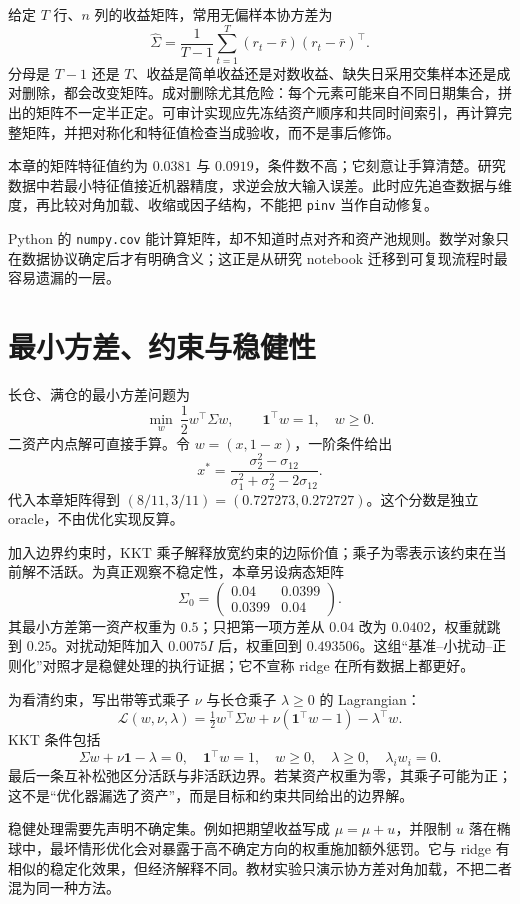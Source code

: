 给定 $T$ 行、$n$ 列的收益矩阵，常用无偏样本协方差为
\[
 \widehat\Sigma=\frac{1}{T-1}
 \sum_{t=1}^{T}(r_t-\bar r)(r_t-\bar r)^\top.
\]
分母是 $T-1$ 还是 $T$、收益是简单收益还是对数收益、缺失日采用交集样本还是成对删除，都会改变矩阵。成对删除尤其危险：每个元素可能来自不同日期集合，拼出的矩阵不一定半正定。可审计实现应先冻结资产顺序和共同时间索引，再计算完整矩阵，并把对称化和特征值检查当成验收，而不是事后修饰。

本章的矩阵特征值约为 $0.0381$ 与 $0.0919$，条件数不高；它刻意让手算清楚。研究数据中若最小特征值接近机器精度，求逆会放大输入误差。此时应先追查数据与维度，再比较对角加载、收缩或因子结构，不能把 \verb|pinv| 当作自动修复。

Python 的 \verb|numpy.cov| 能计算矩阵，却不知道时点对齐和资产池规则。数学对象只在数据协议确定后才有明确含义；这正是从研究 notebook 迁移到可复现流程时最容易遗漏的一层。

\section{最小方差、约束与稳健性}

长仓、满仓的最小方差问题为
\[
 \min_w\ \frac12 w^\top\Sigma w,
 \qquad \mathbf1^\top w=1,\quad w\ge0.
\]
二资产内点解可直接手算。令 $w=(x,1-x)$，一阶条件给出
\[
 x^*=\frac{\sigma_2^2-\sigma_{12}}
 {\sigma_1^2+\sigma_2^2-2\sigma_{12}}.
\]
代入本章矩阵得到 $(8/11,3/11)=(0.727273,0.272727)$。这个分数是独立 oracle，不由优化实现反算。

加入边界约束时，KKT 乘子解释放宽约束的边际价值；乘子为零表示该约束在当前解不活跃。为真正观察不稳定性，本章另设病态矩阵
\[
 \Sigma_0=\begin{pmatrix}0.04&0.0399\\0.0399&0.04\end{pmatrix}.
\]
其最小方差第一资产权重为 $0.5$；只把第一项方差从 $0.04$ 改为 $0.0402$，权重就跳到 $0.25$。对扰动矩阵加入 $0.0075I$ 后，权重回到 $0.493506$。这组“基准--小扰动--正则化”对照才是稳健处理的执行证据；它不宣称 ridge 在所有数据上都更好。

为看清约束，写出带等式乘子 $\nu$ 与长仓乘子 $\lambda\ge0$ 的 Lagrangian：
\[
 \mathcal L(w,\nu,\lambda)
 =\tfrac12w^\top\Sigma w+\nu(\mathbf1^\top w-1)-\lambda^\top w.
\]
KKT 条件包括
\[
 \Sigma w+\nu\mathbf1-\lambda=0,\quad
 \mathbf1^\top w=1,\quad w\ge0,\quad\lambda\ge0,\quad
 \lambda_iw_i=0.
\]
最后一条互补松弛区分活跃与非活跃边界。若某资产权重为零，其乘子可能为正；这不是“优化器漏选了资产”，而是目标和约束共同给出的边界解。

稳健处理需要先声明不确定集。例如把期望收益写成 $\mu=\widehat\mu+u$，并限制 $u$ 落在椭球中，最坏情形优化会对暴露于高不确定方向的权重施加额外惩罚。它与 ridge 有相似的稳定化效果，但经济解释不同。教材实验只演示协方差对角加载，不把二者混为同一种方法。

